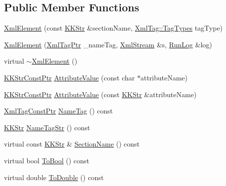 \subsection*{Public Member Functions}
\begin{DoxyCompactItemize}
\item 
\hyperlink{class_k_k_b_1_1_xml_element_a66317eff5bd3abcc60755756ba2887d5}{Xml\+Element} (const \hyperlink{class_k_k_b_1_1_k_k_str}{K\+K\+Str} \&section\+Name, \hyperlink{class_k_k_b_1_1_xml_tag_a6c0ef0e23f982f49d55d4fb7eaff6ac9}{Xml\+Tag\+::\+Tag\+Types} tag\+Type)
\item 
\hyperlink{class_k_k_b_1_1_xml_element_aabceb954a28cf9b21541ff5fbfd3a08b}{Xml\+Element} (\hyperlink{namespace_k_k_b_a9253a3ea8a5da18ca82be4ca2b390ef0}{Xml\+Tag\+Ptr} \+\_\+name\+Tag, \hyperlink{class_k_k_b_1_1_xml_stream}{Xml\+Stream} \&s, \hyperlink{class_k_k_b_1_1_run_log}{Run\+Log} \&log)
\item 
virtual \hyperlink{class_k_k_b_1_1_xml_element_a1e67b1dfcd561d1d602988d100d80d9b}{$\sim$\+Xml\+Element} ()
\item 
\hyperlink{namespace_k_k_b_a46f665ec17615c856eff3d21f78bed5c}{K\+K\+Str\+Const\+Ptr} \hyperlink{class_k_k_b_1_1_xml_element_a34f47feb9eccb898393f91ca76c62032}{Attribute\+Value} (const char $\ast$attribute\+Name)
\item 
\hyperlink{namespace_k_k_b_a46f665ec17615c856eff3d21f78bed5c}{K\+K\+Str\+Const\+Ptr} \hyperlink{class_k_k_b_1_1_xml_element_ab012f75dc6b80e19d0b08005112722f0}{Attribute\+Value} (const \hyperlink{class_k_k_b_1_1_k_k_str}{K\+K\+Str} \&attribute\+Name)
\item 
\hyperlink{namespace_k_k_b_a5f1b0b1667d79fec26deeff10c43df23}{Xml\+Tag\+Const\+Ptr} \hyperlink{class_k_k_b_1_1_xml_element_affa3e099ddb1e81d41140d6666d14932}{Name\+Tag} () const 
\item 
\hyperlink{class_k_k_b_1_1_k_k_str}{K\+K\+Str} \hyperlink{class_k_k_b_1_1_xml_element_a86a0fcbb58e998149503b7735690cd7b}{Name\+Tag\+Str} () const 
\item 
virtual const \hyperlink{class_k_k_b_1_1_k_k_str}{K\+K\+Str} \& \hyperlink{class_k_k_b_1_1_xml_element_a2b85dcb37a0f63bd7979d16d12296876}{Section\+Name} () const 
\item 
virtual bool \hyperlink{class_k_k_b_1_1_xml_element_a7bfbbea204722bc4535a294bc43e8e17}{To\+Bool} () const 
\item 
virtual double \hyperlink{class_k_k_b_1_1_xml_element_ac32778396ab8bdb215ad38f2f33f05de}{To\+Double} () const 
\item 

\end{DoxyCompactItemize}
